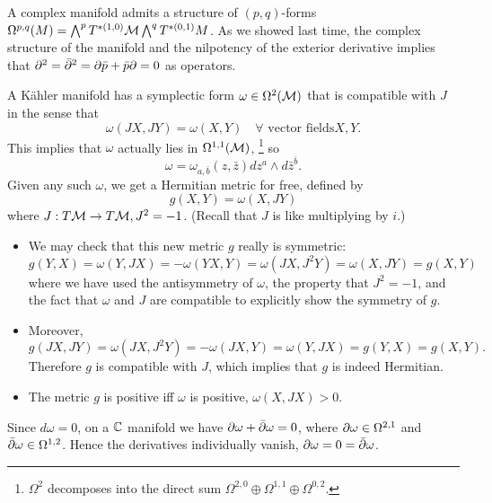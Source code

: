A complex manifold admits a structure of $(p,q)$-forms $\Omega^{p,q}(M) = \bigwedge^p T^{*(1,0)}\mathcal{M} \bigwedge^q T^{*(0,1)}M$. As we showed last time, the complex structure of the manifold and the nilpotency of the exterior derivative implies that $\partial^2=\bar {\partial}^2 = \partial \bar p + \bar p \partial =0$ as operators.

A K\"ahler manifold has a symplectic form $\omega \in \Omega^2(\mathcal{M})$ that is compatible with $J$ in the sense that
\begin{equation}
     \omega(JX,JY) = \omega(X,Y) \quad \forall \text{ vector fields} X,Y.
\end{equation}
This implies that $\omega$ actually lies in $\Omega^{1,1}(\mathcal{M})$,%
    \footnote{$\Omega^2$ decomposes into the direct sum $\Omega^{2,0}\oplus \Omega^{1,1} \oplus \Omega^{0,2}$.}
so
\begin{equation}
    \omega = \omega_{a,\bar b} (z,\bar z) dz^a \wedge d\bar z^{\bar b}.
\end{equation}
Given any such $\omega$, we get a Hermitian metric for free, defined by
\begin{equation}
    g(X,Y)=\omega(X,JY)
\end{equation}
where $J:T\mathcal{M} \to T\mathcal{M}, J^2=-1$. (Recall that $J$ is like multiplying by $i$.)

\begin{itemize}
    \item We may check that this new metric $g$ really is symmetric:
    \begin{equation}
        g(Y,X)=\omega(Y,JX) = -\omega(YX,Y) = \omega(JX,J^2 Y) = \omega(X,JY)=g(X,Y)
    \end{equation}
    where we have used the antisymmetry of $\omega$, the property that $J^2=-1$, and the fact that $\omega$ and $J$ are compatible to explicitly show the symmetry of $g$.
    \item Moreover,
    \begin{equation}
        g(JX,JY)=\omega(JX,J^2Y)=-\omega(JX,Y) = \omega(Y,JX) = g(Y,X) = g(X,Y).
    \end{equation}
    Therefore $g$ is compatible with $J$, which implies that $g$ is indeed Hermitian.
    \item The metric $g$ is positive iff $\omega$ is positive, $\omega(X,JX) > 0$. 
\end{itemize}

Since $d\omega=0$, on a $\mathbb{C}$ manifold we have $\partial \omega +\bar {\partial} \omega =0$, where $\partial \omega \in \Omega^{2,1}$ and $\bar {\partial} \omega \in \Omega^{1,2}$. Hence the derivatives individually vanish, $\partial \omega = 0 =\bar {\partial} \omega$.

